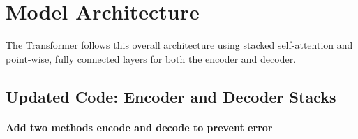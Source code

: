 \documentclass[11pt]{article}
\begin{document}
    \hypertarget{model-architecture}{%
\section{Model Architecture}\label{model-architecture}}

    The Transformer follows this overall architecture using stacked
self-attention and point-wise, fully connected layers for both the
encoder and decoder.

    \hypertarget{updated-code-encoder-and-decoder-stacks}{%
\subsection{Updated Code: Encoder and Decoder
Stacks}\label{updated-code-encoder-and-decoder-stacks}}

\hypertarget{add-two-methods-encode-and-decode-to-prevent-error}{%
\paragraph{Add two methods encode and decode to prevent
error}\label{add-two-methods-encode-and-decode-to-prevent-error}}
\end{document}
